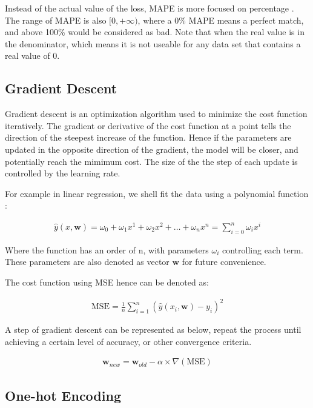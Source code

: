 Instead of the actual value of the loss, MAPE is more focused on percentage \cite{Hyndman}. The range of MAPE is also $[0, +\infty)$, where a 0\% MAPE means a perfect match, and above 100\% would be considered as bad. 
Note that when the real value is in the denominator, which means it is not useable for any data set that contains a real value of 0.

\subsection{Gradient Descent}

Gradient descent is an optimization algorithm used to minimize the cost function iteratively. The gradient or derivative of the cost function at a point tells the direction of the steepest increase of the function. 
Hence if the parameters are updated in the opposite direction of the gradient, the model will be closer, and potentially reach the mimimum cost. 
The size of the the step of each update is controlled by the learning rate. 

For example in linear regression, we shell fit the data using a polynomial function \cite{Bishop}: 

\begin{gather}
    \hat{y}(x, \mathbf{w}) = \omega _0 + \omega _1x^1 + \omega _2x^2 + \dots +\omega _nx^n = \sum_{i=0}^{n}\omega _ix^i 
\end{gather}

Where the function has an order of n, with parameters $\omega_i$ controlling each term. These parameters are also denoted as vector $\mathbf{w}$ for future convenience.

The cost function using MSE hence can be denoted as:

\begin{gather}
    \mathrm{MSE} = \frac{1}{n}\sum_{i=1}^{n}(\hat{y}(x_i, \mathbf{w}) - y_i)^2 
\end{gather}

A step of gradient descent can be represented as below, repeat the process until achieving a certain level of accuracy, or other convergence criteria. 

\begin{gather}
    \mathbf{w}_{new} = \mathbf{w}_{old} - \alpha \times \nabla(\mathrm{MSE})
\end{gather}

\subsection{One-hot Encoding}

